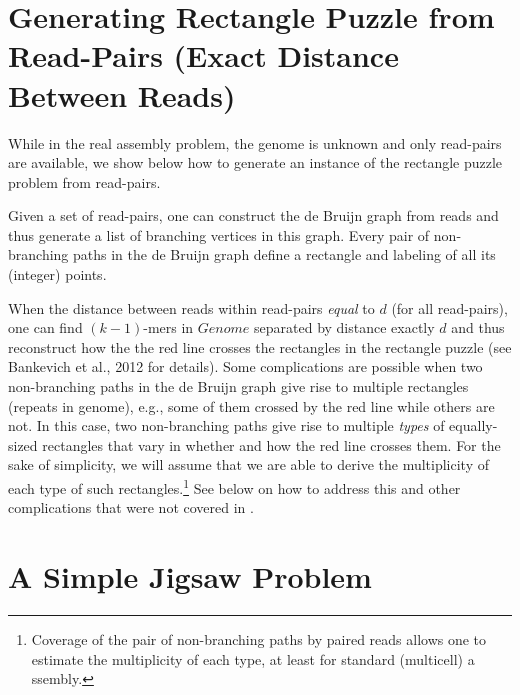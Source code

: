 \documentclass[a4paper]{article}
\begin{document}
\section{Generating Rectangle Puzzle from Read-Pairs (Exact Distance Between Reads)}

While in the real assembly problem, the genome is unknown and only read-pairs are available, we show below how to generate an instance of the rectangle puzzle problem from read-pairs. 

 Given a set of read-pairs, one can construct the de Bruijn graph from reads and thus generate a list of branching vertices in this graph. Every pair of non-branching paths in the de Bruijn graph define a rectangle and labeling of all its (integer) points.  

When the distance between reads within read-pairs {\em equal} to $d$ (for all read-pairs), one can find $(k-1)$-mers in $Genome$ separated by distance exactly $d$ and thus reconstruct how the the red line crosses the rectangles in the rectangle puzzle (see Bankevich et al., 2012 for details).  Some complications are possible when two non-branching paths  in the de Bruijn graph give rise to multiple rectangles (repeats in genome), e.g., some of them crossed by the red line while others are not. In this case, two non-branching paths give rise to multiple {\em types} of equally-sized rectangles that vary in whether and how the red line crosses them.  For the sake of simplicity, we will assume that we are able to derive the multiplicity of  each type of such rectangles.\footnote{Coverage of the pair of non-branching paths by paired reads allows one to estimate the multiplicity of each type, at least for standard (multicell) a
ssembly.}  See below on how to address this and other complications that were not covered in \cite{Bankevich12}. 

\section{A Simple Jigsaw Problem}
\end{document}
